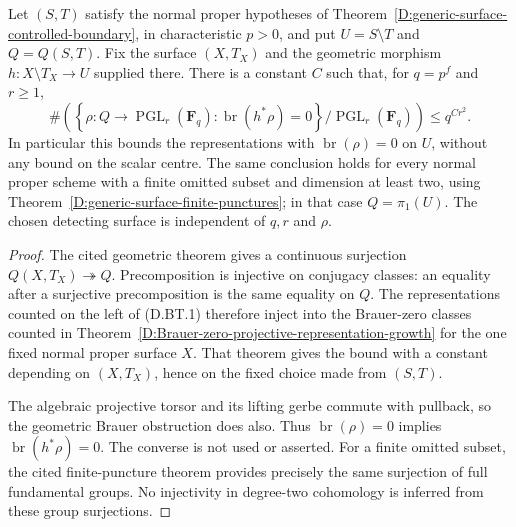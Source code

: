 \begin{corollary}
\label{D:Brauer-zero-detecting-surface-transfer}
Let $(S,T)$ satisfy the normal proper hypotheses of
Theorem~\ref{D:generic-surface-controlled-boundary}, in characteristic
$p>0$, and put $U=S\setminus T$ and $Q=Q(S,T)$.
Fix the surface $(X,T_X)$ and the geometric morphism
$h:X\setminus T_X\to U$ supplied there. There is a constant $C$
such that, for $q=p^f$ and $r\ge1$,
\[
 \#\left(\left\{\rho:Q\to\operatorname{PGL}_r(\mathbf F_q):
       \operatorname{br}(h^*\rho)=0\right\}
       /\operatorname{PGL}_r(\mathbf F_q)\right)
                \le q^{Cr^2}.                         \tag{D.BT.1}
\]
In particular this bounds the representations with
$\operatorname{br}(\rho)=0$ on $U$, without any bound on the
scalar centre. The same conclusion holds for every normal proper
scheme with a finite omitted subset and dimension at least two,
using Theorem~\ref{D:generic-surface-finite-punctures}; in that case
$Q=\pi_1(U)$. The chosen detecting surface is independent of $q,r$
and $\rho$.
\end{corollary}
\begin{proof}
The cited geometric theorem gives a continuous surjection
$Q(X,T_X)\twoheadrightarrow Q$. Precomposition is injective on
conjugacy classes: an equality after a surjective precomposition
is the same equality on $Q$. The representations counted on the
left of (D.BT.1) therefore inject into the Brauer-zero classes
counted in Theorem~\ref{D:Brauer-zero-projective-representation-growth}
for the one fixed normal proper surface $X$. That theorem gives
the bound with a constant depending on $(X,T_X)$, hence on the
fixed choice made from $(S,T)$.

The algebraic projective torsor and its lifting gerbe commute with
pullback, so the geometric Brauer obstruction does also. Thus
$\operatorname{br}(\rho)=0$ implies
$\operatorname{br}(h^*\rho)=0$. The converse is not used or asserted.
For a finite omitted subset, the cited finite-puncture theorem
provides precisely the same surjection of full fundamental groups.
No injectivity in degree-two cohomology is inferred from these
group surjections.
\end{proof}

